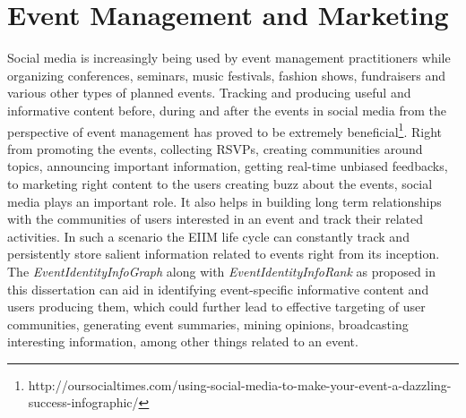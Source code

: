 \section{Event Management and Marketing}
Social media is increasingly being used  by event management practitioners while organizing conferences, seminars, music festivals, fashion shows, fundraisers and various other types of planned events. Tracking and producing useful and informative content before, during and after the events in social media from the perspective of event management has proved to be extremely beneficial\footnote{http://oursocialtimes.com/using-social-media-to-make-your-event-a-dazzling-success-infographic/}. Right from promoting the events, collecting RSVPs, creating communities around topics, announcing important information, getting real-time unbiased feedbacks, to marketing right content to the users creating buzz about the events, social media plays an important role. It also helps in building long term relationships with the communities of users interested in an event and track their related activities. In such a scenario the EIIM life cycle can constantly track and persistently store salient information related to events right from its inception. The \textit{EventIdentityInfoGraph} along with \textit{EventIdentityInfoRank} as proposed in this dissertation can aid in identifying event-specific informative content and users producing them, which could further lead to effective targeting of user communities, generating event summaries, mining opinions, broadcasting interesting information, among other things related to an event.

